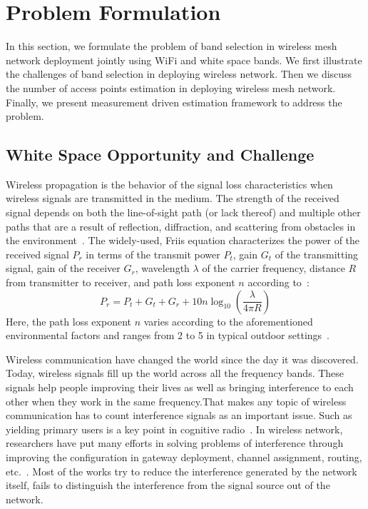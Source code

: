 \section{Problem Formulation}
\label{sec:problemformulation}

In this section, we formulate the problem of band selection in wireless 
mesh network deployment jointly using WiFi and white space bands. 
We first illustrate the challenges of band selection
in deploying wireless network. Then we discuss the number of access
 points estimation in deploying wireless mesh network. Finally, we present 
measurement driven estimation framework to address the problem. 
 
\subsection{White Space Opportunity and Challenge}
\label{subsec:motivation}
Wireless propagation is the behavior of the signal loss characteristics 
when wireless signals are transmitted in the medium.
The strength of the received signal depends on both the line-of-sight
path (or lack thereof) and multiple other paths that are a result of 
reflection, diffraction, and scattering from obstacles in the 
environment~\cite{andersen1995propagation}. The widely-used, Friis
equation characterizes the power of the received signal $P_r$ in terms 
of the transmit power $P_t$, gain $G_t$ of the transmitting signal, gain of 
the receiver $G_r$, wavelength $\lambda$ of the carrier frequency, 
distance $R$ from transmitter to receiver, and path loss exponent $n$ according 
to~\cite{friis}:
\begin{equation}
\label{eq:friis}
P_r=P_t+G_t+G_r+10n \log_{10}\left( \frac{\lambda}{4\pi R}\right)
\end{equation}
Here, the path loss exponent $n$ varies according to the
aforementioned environmental factors and ranges from 2 to 5 in typical
outdoor settings~\cite{rappaport}.


Wireless communication have changed the world since the day it was discovered.
Today, wireless signals fill up the world across all the frequency bands.
These signals help people improving their lives as well as bringing interference 
to each other when they work in the same frequency.That makes any topic of wireless 
communication has to count interference signals as an important issue.
Such as yielding primary users is a key point in cognitive radio~\cite{haykin2005cognitive}. 
In wireless network, researchers have put many efforts in solving problems of interference
through improving the configuration in gateway deployment, channel 
assignment, routing, etc.~\cite{he2008optimizing,tang2005interference}.
Most of the works try to reduce the interference generated by the network itself, 
fails to distinguish the interference from the signal source out of the network.

